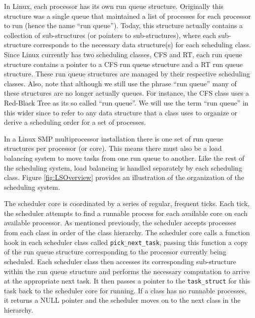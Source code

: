 \documentclass[12pt]{article}
\begin{document}
In Linux, each processor has its own run queue structure. Originally this
structure was a single queue that maintained a list of processes for
each processor to run (hence the name ``run queue'').
Today, this structure actually contains a collection of
sub-structures (or pointers to sub-structures),
where each sub-structure corresponds to the necessary
data structure(s) for each scheduling class. Since Linux currently
has two scheduling classes, CFS and RT, each run queue structure
contains a pointer to a CFS run queue structure and a RT run queue
structure. These
run queue structures are managed by their respective scheduling
classes. Also, note that although we still use the phrase ``run queue''
many of these structures are no longer actually queues. For instance, the CFS
class uses a Red-Black Tree as its so called ``run queue''. We will
use the term ``run queue'' in this wider since to refer to any data
structure that a class uses to organize or derive a scheduling order for a
set of processes.

In a Linux SMP multiprocessor installation there is one set of run queue
structures per processor (or core). This means there must also be
a load balancing system
to move tasks from one run queue to another. Like the rest of the
scheduling system, load balancing is handled separately by each
scheduling class. Figure \ref{fig:LSOverview} provides an illustration
of the organization of the scheduling system.

The scheduler core is coordinated by a series of regular,
frequent ticks. Each tick, the scheduler attempts to find a runnable
process for each available core on each available processor. As
mentioned previously, the scheduler accepts processes from each class
in order of the class hierarchy. The scheduler core calls a function
hook in each scheduler class called \texttt{pick\_next\_task}, passing
this function a copy of the run queue structure corresponding to the
processor currently being scheduled. Each scheduler class then accesses its
corresponding sub-structure within the run queue structure and performs
the necessary computation to arrive at the appropriate next task. It then
passes a pointer to the \texttt{task\_struct} for this task back to the
scheduler core for
running. If a class has no runnable processes, it returns a NULL
pointer and the scheduler moves on to the next class in the hierarchy.
\end{document}
